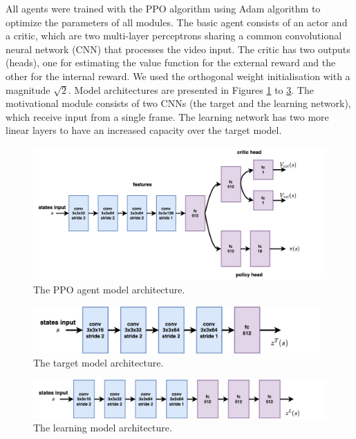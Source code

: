 \documentclass[a4paper,11pt]{elsarticle}
\begin{document}
All agents were trained with the PPO algorithm \citep{schulman2017proximal} using Adam algorithm \citep{kingma2015adam} to optimize the parameters of all modules. The basic agent consists of an actor and a critic, which are two multi-layer perceptrons sharing a common convolutional neural network (CNN) that processes the video input. The critic has two outputs (heads), one for estimating the value function for the external reward and the other for the internal reward. We used the orthogonal weight initialisation with a magnitude $\sqrt{2}$. 
Model architectures are presented in Figures \ref{img:ppo_arch} to %
\ref{img:cnd_learned_arch}. 
The motivational module consists of two CNNs (the target and the learning network), which receive input from a single frame. The learning network has two more linear layers to have an increased capacity over the target model. 

\begin{figure}[t!]
\centering
\includegraphics[width=13cm]{fig/diagrams/cnd-ppo_model.png}
\caption{The PPO agent model architecture.}
\label{img:ppo_arch}
\end{figure}
\begin{figure}[t!]
\centering
\includegraphics[width=11cm]{fig/diagrams/cnd-target_arch.png}
\caption{The target model architecture.}
\label{img:cnd_target_arch}
\end{figure}
\begin{figure}[t!]
\centering
\includegraphics[width=13cm]{fig/diagrams/cnd-learned_arch.png}
\caption{The learning model architecture.}
\label{img:cnd_learned_arch}
\end{figure}
\end{document}
